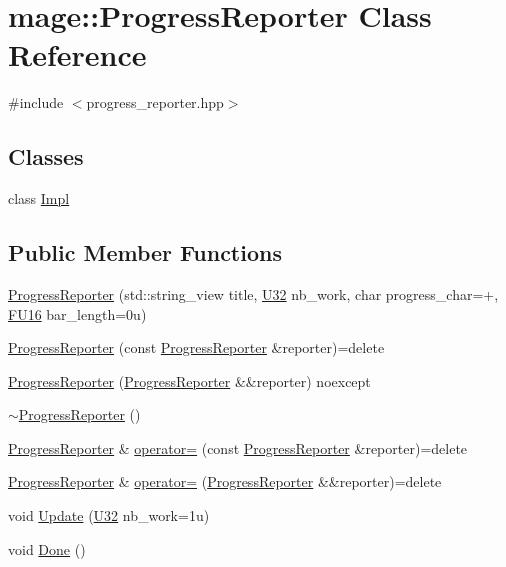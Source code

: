 \hypertarget{classmage_1_1_progress_reporter}{}\section{mage\+:\+:Progress\+Reporter Class Reference}
\label{classmage_1_1_progress_reporter}


{\ttfamily \#include $<$progress\+\_\+reporter.\+hpp$>$}

\subsection*{Classes}
\begin{DoxyCompactItemize}
\item 
class \mbox{\hyperlink{classmage_1_1_progress_reporter_1_1_impl}{Impl}}
\end{DoxyCompactItemize}
\subsection*{Public Member Functions}
\begin{DoxyCompactItemize}
\item 
\mbox{\hyperlink{classmage_1_1_progress_reporter_a8be97435e9c1f4c4f60127ed44101f80}{Progress\+Reporter}} (std\+::string\+\_\+view title, \mbox{\hyperlink{namespacemage_aa5d6eaabaac3cdd01873d6a3d27e90f3}{U32}} nb\+\_\+work, char progress\+\_\+char=\textquotesingle{}+\textquotesingle{}, \mbox{\hyperlink{namespacemage_a4888c2a93673ffcfc3195e561dfdd893}{F\+U16}} bar\+\_\+length=0u)
\item 
\mbox{\hyperlink{classmage_1_1_progress_reporter_a681d23ec19019c04a8a977c4f6f280ea}{Progress\+Reporter}} (const \mbox{\hyperlink{classmage_1_1_progress_reporter}{Progress\+Reporter}} \&reporter)=delete
\item 
\mbox{\hyperlink{classmage_1_1_progress_reporter_a811686b20299f63476c5a5b17c6fa443}{Progress\+Reporter}} (\mbox{\hyperlink{classmage_1_1_progress_reporter}{Progress\+Reporter}} \&\&reporter) noexcept
\item 
\mbox{\hyperlink{classmage_1_1_progress_reporter_aa543239c6dd4474a77cf4cf6904c1b26}{$\sim$\+Progress\+Reporter}} ()
\item 
\mbox{\hyperlink{classmage_1_1_progress_reporter}{Progress\+Reporter}} \& \mbox{\hyperlink{classmage_1_1_progress_reporter_aa98411a059ad0e77ca53d064176f3a86}{operator=}} (const \mbox{\hyperlink{classmage_1_1_progress_reporter}{Progress\+Reporter}} \&reporter)=delete
\item 
\mbox{\hyperlink{classmage_1_1_progress_reporter}{Progress\+Reporter}} \& \mbox{\hyperlink{classmage_1_1_progress_reporter_adfc77427eaff8caf71c1995bf986edc5}{operator=}} (\mbox{\hyperlink{classmage_1_1_progress_reporter}{Progress\+Reporter}} \&\&reporter)=delete
\item 
void \mbox{\hyperlink{classmage_1_1_progress_reporter_aee55b3ced46f7512634b0443ff9807f5}{Update}} (\mbox{\hyperlink{namespacemage_aa5d6eaabaac3cdd01873d6a3d27e90f3}{U32}} nb\+\_\+work=1u)
\item 
void \mbox{\hyperlink{classmage_1_1_progress_reporter_a11d758647ac2082bc296ab53a7454eaa}{Done}} ()
\end{DoxyCompactItemize}
